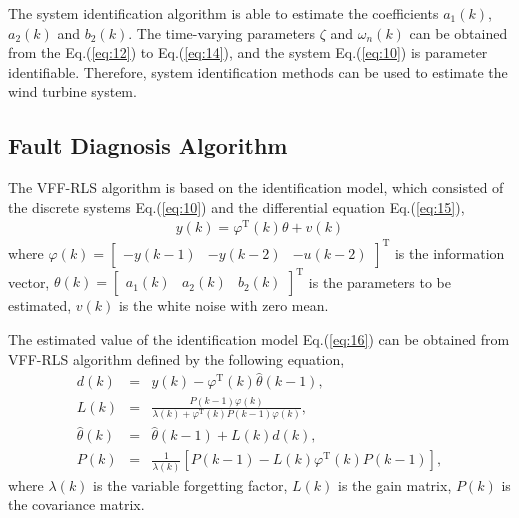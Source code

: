 \documentclass{article}
\begin{document}
The system identification algorithm is able to estimate the
coefficients $a_1(k)$, $a_2(k)$ and $b_2(k)$. The time-varying parameters
$\zeta$ and $\omega_n(k)$ can be obtained from the Eq.(\ref{eq:12}) to
Eq.(\ref{eq:14}), and the system Eq.(\ref{eq:10}) is parameter
identifiable. Therefore, system identification methods can be used to
estimate the wind turbine system.

\subsection{Fault Diagnosis Algorithm}

The VFF-RLS algorithm is based on the identification model, which
consisted of the discrete systems Eq.(\ref{eq:10}) and
the differential equation Eq.(\ref{eq:15}),
\begin{eqnarray}
  y(k) = \varphi^\mathrm{T}(k)\theta + v(k)   \label{eq:16}
\end{eqnarray}
where $\varphi(k)=
\begin{bmatrix}
  -y(k-1)  &  -y(k-2)   &   -u(k-2)
\end{bmatrix}^\mathrm{T}$ is the information vector,
$\theta(k) =
\begin{bmatrix}
  a_1(k)   &   a_2(k)   &   b_2(k)
\end{bmatrix}^\mathrm{T}$ is the parameters to be estimated,
$v(k)$ is the white noise with zero mean.

The estimated value of the identification model Eq.(\ref{eq:16}) can
be obtained from VFF-RLS algorithm defined by the following equation,
\begin{eqnarray}
  d(k)            & = & y(k) - \varphi^\mathrm{T}(k)\hat{\theta}(k-1),   \label{eq:17}\\
  L(k)            & = & \frac{P(k-1)\varphi(k)}{\lambda(k)+\varphi^\mathrm{T}(k)P(k-1)\varphi(k)},  \label{eq:18}\\
  \hat{\theta}(k) & = & \hat{\theta}(k-1) + L(k)d(k),  \label{eq:19}  \\
  P(k)            & = & \frac{1}{\lambda(k)}[P(k-1) - L(k)\varphi^\mathrm{T}(k)P(k-1)],
\end{eqnarray}
where $\lambda(k)$ is the variable forgetting factor, $L(k)$ is the
gain matrix, $P(k)$ is the covariance matrix.
\end{document}
